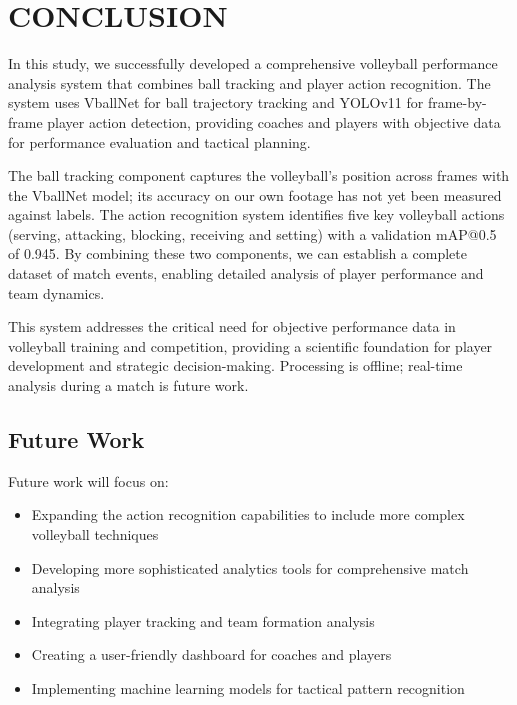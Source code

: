 \documentclass[journal]{IEEEtran}
\begin{document}
\section{CONCLUSION}
In this study, we successfully developed a comprehensive volleyball performance analysis system that combines ball tracking and player action recognition. The system uses VballNet for ball trajectory tracking and YOLOv11 for frame-by-frame player action detection, providing coaches and players with objective data for performance evaluation and tactical planning.

The ball tracking component captures the volleyball's position across frames with the VballNet model; its accuracy on our own footage has not yet been measured against labels. The action recognition system identifies five key volleyball actions (serving, attacking, blocking, receiving and setting) with a validation mAP@0.5 of 0.945. By combining these two components, we can establish a complete dataset of match events, enabling detailed analysis of player performance and team dynamics.

This system addresses the critical need for objective performance data in volleyball training and competition, providing a scientific foundation for player development and strategic decision-making. Processing is offline; real-time analysis during a match is future work.

\subsection{Future Work}
Future work will focus on:
\begin{itemize}
\item Expanding the action recognition capabilities to include more complex volleyball techniques
\item Developing more sophisticated analytics tools for comprehensive match analysis
\item Integrating player tracking and team formation analysis
\item Creating a user-friendly dashboard for coaches and players
\item Implementing machine learning models for tactical pattern recognition
\end{itemize}
\end{document}
